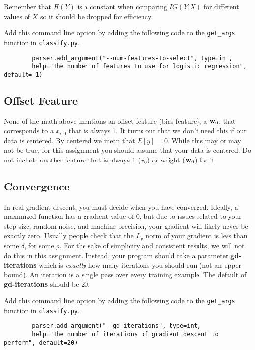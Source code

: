 \documentclass[11pt]{article}
\newcommand{\vw}{{\bf w}}
\newcommand{\code}[1]{{\footnotesize \tt #1}}
\begin{document}
Remember that $H(Y)$ is a constant when comparing $IG(Y|X)$ for different values of $X$ so it should be dropped for efficiency.

Add this command line option by adding the following code to the \code{get\_args} function in \code{classify.py}.
	\begin{footnotesize}
		\begin{verbatim}
		parser.add_argument("--num-features-to-select", type=int, 
		help="The number of features to use for logistic regression", default=-1)
		\end{verbatim}
	\end{footnotesize}


\subsection{Offset Feature}
None of the math above mentions an offset feature (bias feature), a $\vw_0$, that corresponds to a $x_{i,0}$ that is always 1. It turns out that we don't need this if our data is centered. By centered we mean that $E[y] = 0$. While this may or may not be true, for this assignment you should assume that your data is centered. Do not include another feature that is always 1 ($x_0$) or weight ($\vw_0$) for it.


\subsection{Convergence}
In real gradient descent, you must decide when you have converged. Ideally, a maximized function has a gradient value of 0, but due to issues related to your step size, random noise, and machine precision, your gradient will likely never be exactly zero. Usually people check that the $L_p$ norm of your gradient is less than some $\delta$, for some $p$. For the sake of simplicity and consistent results, we will not do this in this assignment. Instead, your program should take a parameter \textbf{gd-iterations} which is \emph{exactly} how many iterations you should run (not an upper bound). An iteration is a single pass over every training example.
The default of \textbf{gd-iterations} should be 20.

Add this command line option by adding the following code to the \code{get\_args} function in \code{classify.py}.
	\begin{footnotesize}
		\begin{verbatim}
		parser.add_argument("--gd-iterations", type=int, 
		help="The number of iterations of gradient descent to perform", default=20)
		\end{verbatim}
	\end{footnotesize}
\end{document}
